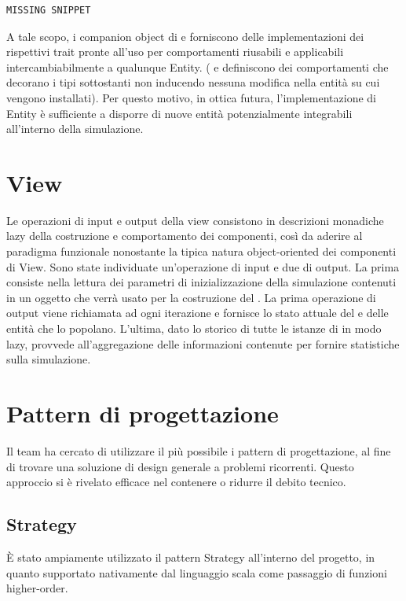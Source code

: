 \begin{verbatim}
MISSING SNIPPET
\end{verbatim}

A tale scopo, i companion object di  e  forniscono delle implementazioni dei rispettivi trait pronte all’uso per comportamenti riusabili e applicabili intercambiabilmente a qualunque Entity. ( e  definiscono dei comportamenti che decorano i tipi sottostanti non inducendo nessuna modifica nella entità su cui vengono installati). Per questo motivo, in ottica futura, l’implementazione di Entity è sufficiente a disporre di nuove entità potenzialmente integrabili all’interno della simulazione.

\section{View}

Le operazioni di input e output della view consistono in descrizioni monadiche lazy della costruzione e comportamento dei componenti, così da aderire al paradigma funzionale nonostante la tipica natura object-oriented dei componenti di View. Sono state individuate un'operazione di input e due di output. La prima consiste nella lettura dei parametri di inizializzazione della simulazione contenuti in un oggetto  che verrà usato per la costruzione del . La prima operazione di output viene richiamata ad ogni iterazione e fornisce lo stato attuale del  e delle entità che lo popolano. L'ultima, dato lo storico di tutte le istanze di  in modo lazy, provvede all'aggregazione delle informazioni contenute per fornire statistiche sulla simulazione.


\section{Pattern di progettazione}
Il team ha cercato di utilizzare il più possibile i pattern di progettazione, al fine di trovare una soluzione di design generale a problemi ricorrenti. Questo approccio si è rivelato efficace nel contenere o ridurre il debito tecnico.
\subsection{Strategy}
È stato ampiamente utilizzato il pattern Strategy all’interno del progetto, in quanto supportato nativamente dal linguaggio scala come passaggio di funzioni higher-order.
